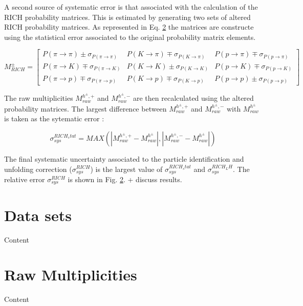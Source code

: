 A second source of systematic error is that associated with the calculation of the RICH probability matrices. This is estimated by generating two sets of altered
RICH probability matrices. As represented in Eq. \ref{} the matrices are constructe using the statistical error associated to the original probability matrix elements.

\begin{equation}
  M^{\pm}_{RICH}
  =
  \begin{bmatrix}
  P(\pi \rightarrow \pi)\pm\sigma_{P(\pi \rightarrow \pi)} & P(K \rightarrow \pi)\mp\sigma_{P(K \rightarrow \pi)} & P(p \rightarrow \pi)\mp\sigma_{P(p \rightarrow \pi)}\\
  P(\pi \rightarrow K)\mp\sigma_{P(\pi \rightarrow K)} & P(K \rightarrow K)\pm\sigma_{P(K \rightarrow K)} & P(p \rightarrow K)\mp\sigma_{P(p \rightarrow K)} \\
  P(\pi \rightarrow p)\mp\sigma_{P(\pi \rightarrow p)} & P(K \rightarrow p)\mp\sigma_{P(K \rightarrow p)} & P(p \rightarrow p)\pm\sigma_{P(p \rightarrow p)}
  \end{bmatrix}
\end{equation}

The raw multiplicities $M^{h^{\pm},+}_{raw}$ and $M^{h^{\pm},-}_{raw}$ are then recalculated using the altered probability matrices. The largest difference between
$M^{h^{\pm},+}_{raw}$ and $M^{h^{\pm},-}_{raw}$ with $M^{h^{\pm}}_{raw}$ is taken as the sytematic error :

\begin{equation}
  \sigma^{RICH_stat}_{sys} = MAX(|M^{h^{\pm},+}_{raw}-M^{h^{\pm}}_{raw}|,|M^{h^{\pm},-}_{raw}-M^{h^{\pm}}_{raw}|)
\end{equation}

The final systematic uncertainty associated to the particle identification and unfolding correction ($\sigma^{RICH}_{sys}$) is the largest value of $\sigma^{RICH_stat}_{sys}$
 and $\sigma^{RICH_LH}_{sys}$. The relative error $\sigma^{RICH}_{sys}$ is shown in Fig. \ref{}.
 + discuss results.


\section{Data sets}

Content


\section{Raw Multiplicities}

Content
